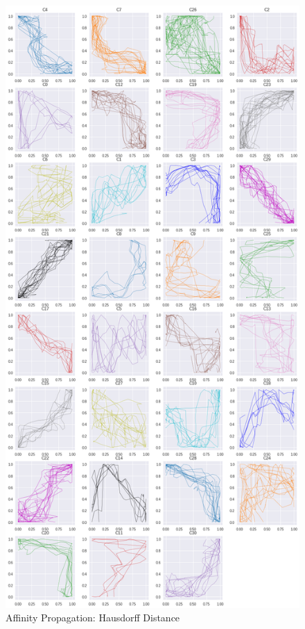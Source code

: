 \begin{figure}[h]
  \centering
  \includegraphics[width=\linewidth,height=\textheight,keepaspectratio]{figs/clusters/CLU_AP_ALL[Hd].png}
  \caption{Affinity Propagation: Hausdorff Distance}
\end{figure}

